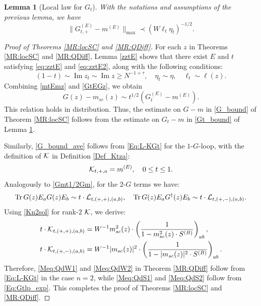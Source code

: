 \documentclass[10pt,reqno]{article}
\DeclareMathOperator{\im}{{\mathrm{Im}}}
\DeclareMathOperator{\tr}{Tr}
\theoremstyle{plain} %
\newtheorem{lemma}[theorem]{Lemma}
\theoremstyle{remark}
\numberwithin{equation}{section}
\begin{document}
\begin{lemma}[Local law for $G_t$]\label{ML:GtLocal}
   With the notations and assumptions of the previous lemma, we have 
\begin{equation}\label{Gt_bound}
 \|G^{(E)}_{t,+}-m^{(E)}\|_{\max}\prec (W\ell_t\eta_t)^{-1/2}.
   \end{equation} 
\end{lemma}
 

\medskip 

\begin{proof}[Proof of Theorems \ref{MR:locSC} and \ref{MR:QDiff}]
For each $z$ in Theorems \ref{MR:locSC} and \ref{MR:QDiff}, Lemma \ref{zztE} shows that there exist $E$ and $t$ satisfying \eqref{eq:zztE} and \eqref{eq:zztE2}, along with the following conditions:
$$
(1-t) \sim \im z_t \sim \im z \geq N^{-1+\tau}, \quad \eta_t \sim \eta, \quad \ell_t \sim \ell(z).
$$
Combining \eqref{mtEmz} and \eqref{GtEGz}, we obtain
\begin{equation}\label{Gmt1/2Gm}
G(z) - m_{sc}(z) \sim  t^{1/2} \left(G_t^{(E)} - m^{(E)}\right).
\end{equation}
This relation holds in distribution.  Thus, the estimate on $G - m$ in \eqref{G_bound} of Theorem \ref{MR:locSC} follows from the estimate on $G_t - m$ in \eqref{Gt_bound} of Lemma \ref{ML:GtLocal}.

Similarly, \eqref{G_bound_ave} follows from \eqref{Eq:L-KGt} for the $1$-$G$-loop, with the definition of $\cal K$ in Definition \ref{Def_Ktza}:
$$
{\cal K}_{t,+,a} = m^{(E)}, \quad 0\le t\le 1. 
$$
Analogously to \eqref{Gmt1/2Gm}, for the $2$-$G$ terms we have:
\begin{equation}\label{Gmt1/2Gm2}
\tr G (z) E_aG (z) E_b \sim t \cdot {\cal L}_{t, (+,+),(a,b)}, \quad \tr G(z) E_aG^\dagger(z)  E_b\sim  t \cdot {\cal L}_{t, (+,-),(a,b)}.
\end{equation}
Using \eqref{Kn2sol} for rank-$2$ $\cal K$, we derive:
\begin{align*}
t \cdot {\cal K}_{t, (+,+),(a,b)}
&= W^{-1} m^2_{sc}(z) \cdot \left(\frac{1}{1 - m^2_{sc}(z) \cdot S^{(B)}}\right)_{ab}, \\
t \cdot {\cal K}_{t, (+,-),(a,b)}
&= W^{-1} |m_{sc}(z)|^2 \cdot \left(\frac{1}{1 - |m_{sc}(z)|^2 \cdot S^{(B)}}\right)_{ab}.
\end{align*}
Therefore, \eqref{Meq:QdW1} and \eqref{Meq:QdW2} in Theorem \ref{MR:QDiff} follow from \eqref{Eq:L-KGt} in the case $n=2$, while \eqref{Meq:QdS1} and \eqref{Meq:QdS2} follow from \eqref{Eq:Gtlp_exp}. 
This completes the proof of Theorems \ref{MR:locSC} and \ref{MR:QDiff}.
 \end{proof}
\end{document}
